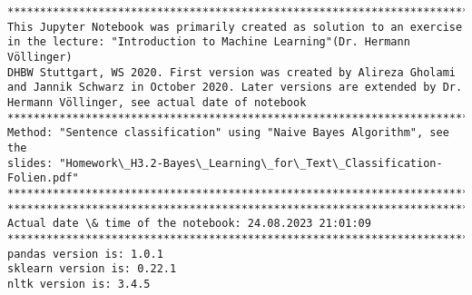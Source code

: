 \documentclass[11pt]{article}
\begin{document}
    \begin{Verbatim}[commandchars=\\\{\}]
***********************************************************************
This Jupyter Notebook was primarily created as solution to an exercise
in the lecture: "Introduction to Machine Learning"(Dr. Hermann Völlinger)
DHBW Stuttgart, WS 2020. First version was created by Alireza Gholami
and Jannik Schwarz in October 2020. Later versions are extended by Dr.
Hermann Völlinger, see actual date of notebook
*************************************************************************
Method: "Sentence classification" using "Naive Bayes Algorithm", see the
slides: "Homework\_H3.2-Bayes\_Learning\_for\_Text\_Classification-Folien.pdf"
*************************************************************************
************************************************************************
Actual date \& time of the notebook: 24.08.2023 21:01:09
************************************************************************
pandas version is: 1.0.1
sklearn version is: 0.22.1
nltk version is: 3.4.5
    \end{Verbatim}
\end{document}
